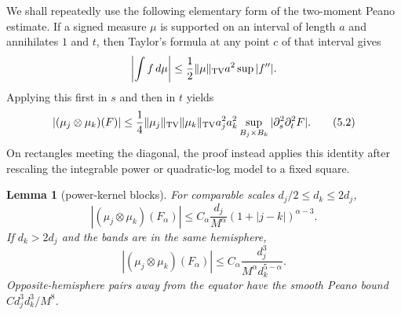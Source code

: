 \documentclass[11pt]{amsart}
\newtheorem{lemma}[theorem]{Lemma}
\begin{document}
We shall repeatedly use the following elementary form of the two-moment
Peano estimate.  If a signed measure $\mu$ is supported on an interval of
length $a$ and annihilates $1$ and $t$, then Taylor's formula at any point
$c$ of that interval gives
\[
 \left|\int f\,d\mu\right|
 \le\frac12\|\mu\|_{\rm TV}a^2
 \sup|f''|.
\]
Applying this first in $s$ and then in $t$ yields
\begin{equation}\label{eq:tenslopeano}
 |(\mu_j\otimes\mu_k)(F)|
 \le\frac14\|\mu_j\|_{\rm TV}\|\mu_k\|_{\rm TV}
 a_j^2a_k^2
 \sup_{B_j\times B_k}|\partial_s^2\partial_t^2F|.    \tag{5.2}
\end{equation}
On rectangles meeting the diagonal, the proof instead applies this
identity after rescaling the integrable power or quadratic-log model to a
fixed square.

\begin{lemma}[power-kernel blocks]\label{lem:blocks}
For comparable scales $d_j/2\le d_k\le2d_j$,
\begin{equation}\label{eq:comparableblock}
 |(\mu_j\otimes\mu_k)(F_\alpha)|
 \le C_\alpha\frac{d_j}{M^\alpha}
 (1+|j-k|)^{\alpha-3}.                               \tag{5.3}
\end{equation}
If $d_k>2d_j$ and the bands are in the same hemisphere,
\begin{equation}\label{eq:farblock}
 |(\mu_j\otimes\mu_k)(F_\alpha)|
 \le C_\alpha\frac{d_j^3}
 {M^\alpha d_k^{5-\alpha}}.                          \tag{5.4}
\end{equation}
Opposite-hemisphere pairs away from the equator have the smooth Peano bound
$Cd_j^3d_k^3/M^8$.
\end{lemma}
\end{document}
